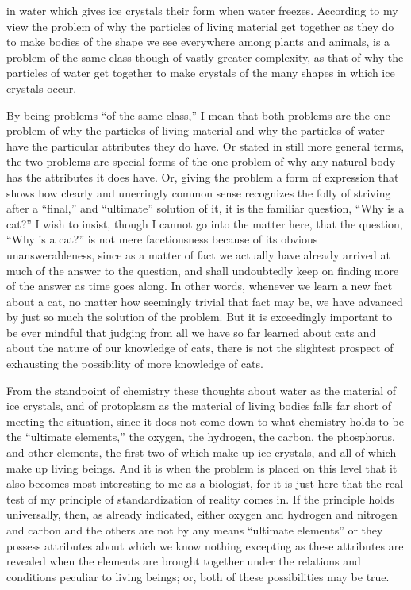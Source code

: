 \documentclass[a4paper, 11pt, oneside, polutonikogreek, english, landscape]{article}
\begin{document}
in water which gives ice crystals their form when water freezes. According to my view the problem of why the particles of living material get together as they do to make bodies of the shape we see everywhere among plants and animals, is a problem of the same class though of vastly greater complexity, as that of why the particles of water get together to make crystals of the many shapes in which ice crystals occur.

By being problems ``of the same class,'' I mean that both problems are the one problem of why the particles of living material and why the particles of water have the particular attributes they do have. Or stated in still more general terms, the two problems are special forms of the one problem of why any natural body has the attributes it does have. Or, giving the problem a form of expression that shows how clearly and unerringly common sense recognizes the folly of striving after a ``final,'' and ``ultimate'' solution of it, it is the familiar question, ``Why is a cat?'' I wish to insist, though I cannot go into the matter here, that the question, ``Why is a cat?'' is not mere facetiousness because of its obvious unanswerableness, since as a matter of fact we actually have already arrived at much of the answer to the question, and shall undoubtedly keep on finding more of the answer as time goes along. In other words, whenever we learn a new fact about a cat, no matter how seemingly trivial that fact may be, we have advanced by just so much the solution of the problem. But it is exceedingly important to be ever mindful that judging from all we have so far learned about cats and about the nature of our knowledge of cats, there is not the slightest prospect of exhausting the possibility of more knowledge of cats.

From the standpoint of chemistry these thoughts about water as the material of ice crystals, and of protoplasm as the material of living bodies falls far short of meeting the situation, since it does not come down to what chemistry holds to be the ``ultimate elements,'' the oxygen, the hydrogen, the carbon, the phosphorus, and other elements, the first two of which make up ice crystals, and all of which make up living beings. And it is when the problem is placed on this level that it also becomes most interesting to me as a biologist, for it is just here that the real test of my principle of standardization of reality comes in. If the principle holds universally, then, as already indicated, either oxygen and hydrogen and nitrogen and carbon and the others are not by any means ``ultimate elements'' or they possess attributes about which we know nothing excepting as these attributes are revealed when the elements are brought together under the relations and conditions peculiar to living beings; or, both of these possibilities may be true.
\end{document}
